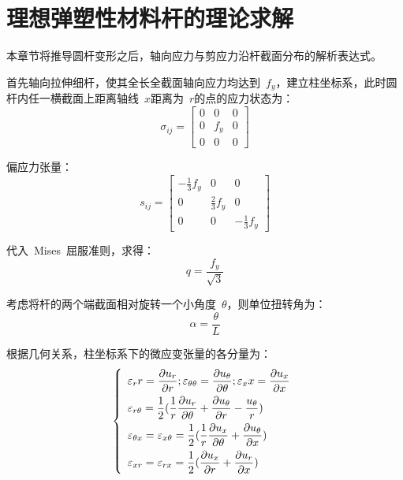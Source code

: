 \chapter{理想弹塑性材料杆的理论求解}
\label{cha:ideal_theory}
本章节将推导圆杆变形之后，轴向应力与剪应力沿杆截面分布的解析表达式。

首先轴向拉伸细杆，使其全长全截面轴向应力均达到~{$f_y$}，建立柱坐标系，此时圆杆内任一横截面上距离轴线~{$x$}距离为~{$r$}的点的应力状态为：
\begin{equation}\label{eq4}
    \sigma_{ij} = \begin{bmatrix}
        0 & 0 & 0 \\
        0 & f_y & 0 \\
        0 & 0 & 0
        \end{bmatrix}
\end{equation} 

偏应力张量：
\begin{equation}\label{eq5}
    s_{ij} = \begin{bmatrix}
        -\frac{1}{3}f_y & 0 & 0 \\
        0 & \frac{2}{3}f_y & 0 \\
        0 & 0 & -\frac{1}{3}f_y
        \end{bmatrix}
\end{equation} 

代入~Mises~屈服准则，求得：
\begin{equation}\label{eq6}
    q = \frac{f_y}{\sqrt{3}}
\end{equation} 

考虑将杆的两个端截面相对旋转一个小角度~{$\theta$}，则单位扭转角为：
\begin{equation}\label{eq7}
    \alpha  = \frac{\theta }{L}
\end{equation} 

根据几何关系，柱坐标系下的微应变张量的各分量为：
\begin{equation}\label{eq8}
    \left\{
        \begin{array}{l}
            \varepsilon_rr = \dfrac{\partial u_r}{\partial r}; \varepsilon_{\theta\theta} = \dfrac{\partial u_\theta}{\partial \theta}; \varepsilon_xx = \dfrac{\partial u_x}{\partial x}\vspace{1ex}\\
            \varepsilon_{r\theta} = \dfrac{1}{2}(\dfrac{1}{r}\dfrac{\partial u_r}{\partial \theta}+\dfrac{\partial u_\theta}{\partial r}-\dfrac{u_\theta}{r})\vspace{1ex}\\
            \varepsilon_{\theta x} = \varepsilon_{x \theta}=\dfrac{1}{2}(\dfrac{1}{r}\dfrac{\partial u_x}{\partial \theta}+\dfrac{\partial u_\theta}{\partial x})\vspace{1ex}\\
            \varepsilon_{xr} = \varepsilon_{rx}=\dfrac{1}{2}(\dfrac{\partial u_x}{\partial r}+\dfrac{\partial u_r}{\partial x})\\
        \end{array}
    \right.
\end{equation} 

